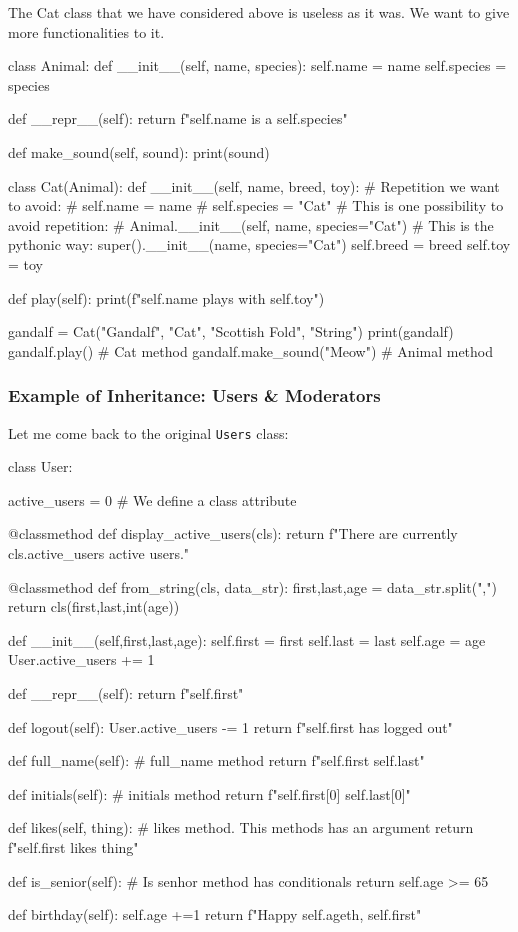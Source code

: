 The Cat class that we have considered above is useless as it was. We want to give more functionalities to it. 
\begin{listing}{1}
    class Animal:
    def __init__(self, name, species):
        self.name = name 
        self.species = species

    def __repr__(self):
        return f"{self.name} is a {self.species}"
        
    def make_sound(self, sound):
        print(sound)
    
class Cat(Animal):
    def __init__(self, name, breed, toy): 
# Repetition we want to avoid:
#       self.name = name 
#       self.species = "Cat" 
# This is one possibility to avoid repetition:
#       Animal.__init__(self, name, species="Cat") 
# This is the pythonic way:
        super().__init__(name, species="Cat")
        self.breed = breed
        self.toy = toy

        def play(self):
            print(f"{self.name} plays with {self.toy}")

gandalf = Cat("Gandalf", "Cat", "Scottish Fold", "String")
print(gandalf)
gandalf.play() # Cat method
gandalf.make_sound("Meow") # Animal method
\end{listing}

\subsubsection{Example of Inheritance: Users \& Moderators}

Let me come back to the original \verb|Users| class:
\begin{listing}{1}
class User: 

    active_users = 0 # We define a class attribute

    @classmethod
    def display_active_users(cls):
        return f"There are currently {cls.active_users} active users."

    @classmethod
    def from_string(cls, data_str):
        first,last,age = data_str.split(",")        
        return cls(first,last,int(age))

    def __init__(self,first,last,age):
        self.first = first
        self.last = last
        self.age = age
        User.active_users += 1
        
    def __repr__(self):
        return f"{self.first}"	

    def logout(self): 
        User.active_users -= 1 
        return f"{self.first} has logged out"  

    def full_name(self): # full_name method
        return f"{self.first} {self.last}"

    def initials(self): # initials method
        return f"{self.first[0]} {self.last[0]}"

    def likes(self, thing): # likes method. This methods has an argument
        return f"{self.first} likes {thing}"

    def is_senior(self): # Is senhor method has conditionals
        return self.age >= 65    

    def birthday(self):
        self.age +=1
        return f"Happy {self.age}th, {self.first}"
\end{listing}

